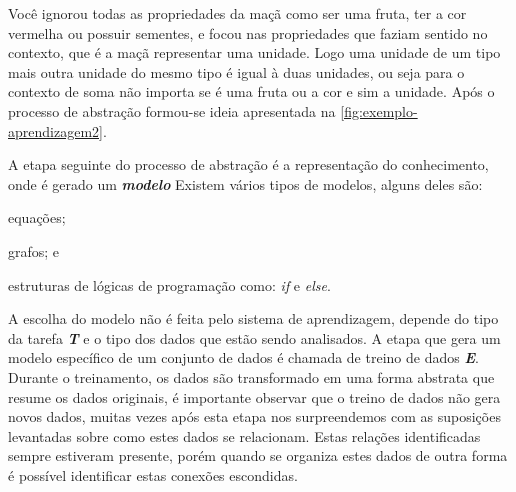 \begin{figure}[ht!]
	\centering
\end{figure}

Você ignorou todas as propriedades da maçã como ser uma fruta, ter a cor vermelha  ou possuir sementes, e focou nas propriedades que faziam sentido no contexto, que é a maçã representar uma unidade. Logo uma unidade de um tipo mais outra unidade do mesmo tipo é igual à duas unidades, ou seja para o contexto de soma não importa se é uma fruta ou a cor e sim a unidade. Após o processo de abstração formou-se ideia apresentada na \autoref{fig:exemplo-aprendizagem2}.


\begin{figure}[ht!]
	\centering
\end{figure}

A etapa seguinte do processo de abstração é a representação do conhecimento, onde é gerado um 
\textbf{\textit{modelo}} 
Existem vários tipos de modelos, alguns deles são:
\begin{alineas}
    \item equações;
    \item grafos; e
    \item estruturas de lógicas de programação como: \textit{if} e \textit{else}. 
\end{alineas} 

A escolha do modelo não é feita pelo sistema de aprendizagem, depende do tipo da tarefa \textbf{\textit{T}} e o tipo dos dados
que estão sendo analisados. A etapa que gera um modelo específico de um conjunto de dados é chamada de treino de dados \textbf{\textit{E}}. 
Durante o treinamento, os dados são transformado em uma forma abstrata que resume os dados originais, é importante observar que o  
treino de dados não gera novos dados, muitas vezes após esta etapa nos surpreendemos com as suposições levantadas sobre como 
estes dados se relacionam. Estas relações identificadas sempre estiveram presente, porém quando se organiza estes dados de outra forma
é possível identificar estas conexões escondidas.

